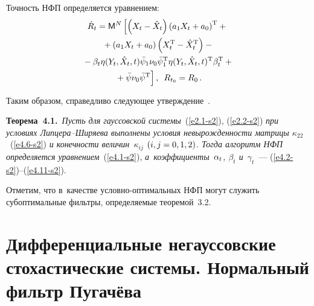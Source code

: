 \begin{multicols}{2}
Точность НФП определяется уравнением:
\begin{multline}
\dot R_t = \mm^N \left[\left( X_t -\hx_t\right) 
\left(a_1 X_t + a_0\right)^{\mathrm{T}} +{}\right.\\
{}+\left(a_1 X_t + a_0\right)  
\left(X_t^{\mathrm{T}} -\hx_t^{\mathrm{T}}\right)-{}\\
{}-\beta_t \eta \yutt \bar\psi_1 \nu_0 \bar\psi_1^{\mathrm{T}} 
\eta \yutt^{\mathrm{T}} \beta_t^{\mathrm{T}} +{}\\
\left.{}+\bar\psi \nu_0 \bar\psi^{\mathrm{T}}
\vphantom{\left(a_1 X_t + a_0\right)^{\mathrm{T}}}
\right],\enskip R_{t_0} = R_0\,.
\label{e4.11-s2}
\end{multline}

Таким образом, справедливо следующее утверж\-де\-ние~\cite{1-s2}.

\smallskip

\noindent
\textbf{Теорема~4.1.}\
\textit{Пусть для гауссовской системы}~(\ref{e2.1-s2}), (\ref{e2.2-s2}) 
\textit{при условиях Лип\-це\-ра--Ши\-ря\-ева выполнены условия невырожденности 
матрицы  $\kappa_{22}$}~(\ref{e4.6-s2}) 
\textit{и конечности величин~$\kappa_{ij}$ $(i,j\hm=0,1,2)$. Тогда алгоритм НФП 
определяется уравнением}~(\ref{e4.1-s2}),  
\textit{а~коэффициенты~$\alpha_t$, $\beta_t$ и~$\gamma_t$}~--- 
(\ref{e4.2-s2})--(\ref{e4.11-s2}).

\smallskip


Отметим, что в~качестве услов\-но-оп\-ти\-маль\-ных НФП могут служить 
субоптимальные фильтры, определяемые теоремой~3.2.


\section{Дифференциальные негауссовские стохастические системы. 
Нормальный  фильтр Пугачёва}


\end{multicols}

